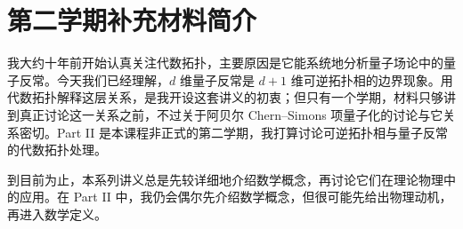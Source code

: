 \chapter*{第二学期补充材料简介}

我大约十年前开始认真关注代数拓扑，主要原因是它能系统地分析量子场论中的量子反常。今天我们已经理解，$d$ 维量子反常是 $d+1$ 维可逆拓扑相的边界现象。用代数拓扑解释这层关系，是我开设这套讲义的初衷；但只有一个学期，材料只够讲到真正讨论这一关系之前，不过关于阿贝尔 Chern--Simons 项量子化的讨论与它关系密切。Part II 是本课程非正式的第二学期，我打算讨论可逆拓扑相与量子反常的代数拓扑处理。

到目前为止，本系列讲义总是先较详细地介绍数学概念，再讨论它们在理论物理中的应用。在 Part II 中，我仍会偶尔先介绍数学概念，但很可能先给出物理动机，再进入数学定义。
